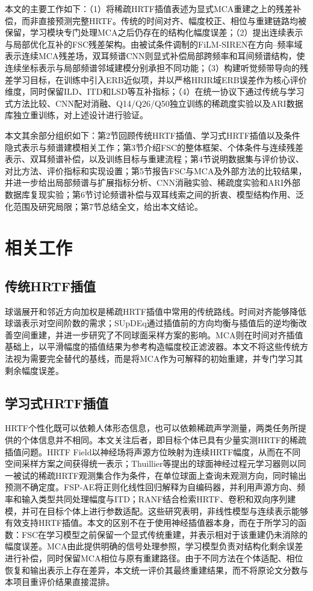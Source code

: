 \documentclass[UTF8,a4paper]{article}
\begin{document}
本文的主要工作如下：（1）将稀疏HRTF插值表述为显式MCA重建之上的残差补偿，而非直接预测完整HRTF。传统的时间对齐、幅度校正、相位与重建链路均被保留，学习模块专门处理MCA之后仍存在的结构化幅度误差；（2）提出连续表示与局部优化互补的FSC残差架构。由被试条件调制的FiLM-SIREN在方向--频率域表示连续MCA残差场，双耳频谱CNN则显式补偿局部跨频率和耳间频谱结构，使连续坐标表示与局部频谱邻域建模分别承担不同功能；（3）构建听觉频带导向的残差学习目标，在训练中引入ERB近似项，并以严格HRIR域ERB误差作为核心评价维度，同时保留ILD、ITD和LSD等互补指标；（4）在统一协议下通过传统与学习式方法比较、CNN配对消融、Q14/Q26/Q50独立训练的稀疏度实验以及ARI数据库独立重训练，对上述设计进行验证。

本文其余部分组织如下：第2节回顾传统HRTF插值、学习式HRTF插值以及条件隐式表示与频谱建模相关工作；第3节介绍FSC的整体框架、个体条件与连续残差表示、双耳频谱补偿，以及训练目标与重建流程；第4节说明数据集与评价协议、对比方法、评价指标和实现设置；第5节报告FSC与MCA及外部方法的比较结果，并进一步给出局部频谱与扩展指标分析、CNN消融实验、稀疏度实验和ARI外部数据库复现实验；第6节讨论频谱补偿与双耳线索之间的折衷、模型结构作用、泛化范围及研究局限；第7节总结全文，给出本文结论。

\section{相关工作}
\label{sec:related}

\subsection{传统HRTF插值}
球谐展开和邻近方向加权是稀疏HRTF插值中常用的传统路线。时间对齐能够降低球谐表示对空间阶数的需求\cite{R3}；SUpDEq通过插值前的方向均衡与插值后的逆均衡改善空间重建，并进一步研究了不同球面采样方案的影响\cite{R2,R2S}。MCA则在时间对齐插值基础上，以平滑幅度的插值结果为参考构造幅度校正滤波器\cite{R1}。本文不将这些传统方法视为需要完全替代的基线，而是将MCA作为可解释的初始重建，并专门学习其剩余幅度误差。

\subsection{学习式HRTF插值}
HRTF个性化既可以依赖人体形态信息，也可以依赖稀疏声学测量，两类任务所提供的个体信息并不相同\cite{R15,R16}。本文关注后者，即目标个体已具有少量实测HRTF的稀疏插值问题。HRTF Field以神经场将声源方位映射为连续HRTF幅度，从而在不同空间采样方案之间获得统一表示\cite{R22}；Thuillier等提出的球面神经过程元学习器则以同一被试的稀疏HRTF观测集合作为条件，在单位球面上查询未观测方向，同时输出预测不确定度\cite{R26}。FSP-AE将正则化线性回归解释为自编码器，并利用声源方向、频率和输入类型共同处理幅度与ITD\cite{R4}；RANF结合检索HRTF、卷积和双向序列建模，并可在目标个体上进行参数适配\cite{R5}。这些研究表明，非线性模型与连续表示能够有效支持HRTF插值。本文的区别不在于使用神经插值器本身，而在于所学习的函数：FSC在学习模型之前保留一个显式传统重建，并表示相对于该重建仍未消除的幅度误差。MCA由此提供明确的信号处理参照，学习模型负责对结构化剩余误差进行补偿，同时保留MCA相位与原有重建路径。由于不同方法在个体适配、相位恢复和输出表示上存在差异，本文统一评价其最终重建结果，而不将原论文分数与本项目重评价结果直接混排。
\end{document}
